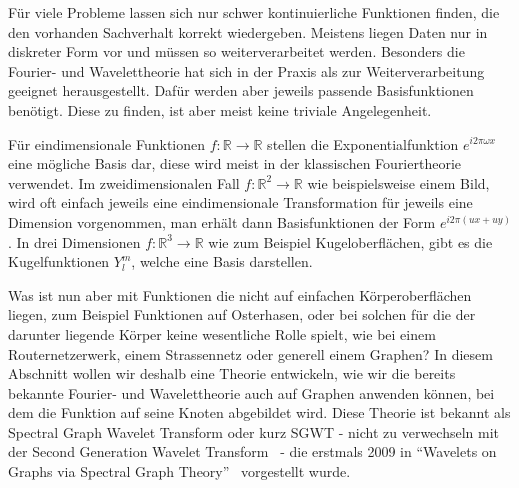 

F\"ur viele Probleme lassen sich nur schwer kontinuierliche Funktionen finden, 
die den vorhanden Sachverhalt korrekt wiedergeben. Meistens liegen Daten 
nur in diskreter Form vor und m\"ussen so weiterverarbeitet werden. Besonders 
die Fourier- und Wavelettheorie hat sich in der Praxis als zur 
Weiterverarbeitung geeignet herausgestellt. Daf\"ur werden aber jeweils 
passende Basisfunktionen ben\"otigt. Diese zu finden, ist aber meist keine 
triviale Angelegenheit.

F\"ur eindimensionale Funktionen $f: \mathbb{R} \rightarrow \mathbb{R}$ stellen 
die Exponentialfunktion $e^{i2\pi\omega x}$ eine m\"ogliche Basis dar, diese 
wird meist in der klassischen Fouriertheorie verwendet. Im 
zweidimensionalen Fall $f: \mathbb{R}^2 \rightarrow \mathbb{R}$ wie 
beispielsweise einem Bild, wird oft einfach jeweils eine eindimensionale 
Transformation f\"ur jeweils eine Dimension vorgenommen, man erh\"alt dann 
Basisfunktionen der Form $e^{i2\pi(ux+uy)}$. In drei Dimensionen $f: 
\mathbb{R}^3 \rightarrow \mathbb{R}$ wie zum Beispiel Kugeloberfl\"achen, gibt 
es die Kugelfunktionen $Y^m_l$, welche eine Basis darstellen.

Was ist nun aber mit Funktionen die nicht auf einfachen K\"orperoberfl\"achen 
liegen, zum Beispiel Funktionen auf Osterhasen, oder bei solchen f\"ur die der 
darunter liegende K\"orper keine wesentliche Rolle spielt, wie bei einem 
Routernetzerwerk, einem Strassennetz oder generell einem Graphen? In diesem 
Abschnitt wollen wir deshalb eine Theorie entwickeln, wie wir die bereits 
bekannte Fourier- und Wavelettheorie auch auf Graphen anwenden k\"onnen, bei 
dem die Funktion auf seine Knoten abgebildet wird. Diese Theorie ist bekannt 
als Spectral Graph Wavelet Transform oder kurz SGWT - nicht zu verwechseln mit 
der Second Generation Wavelet Transform~\cite{noauthor_second-generation_2018} 
- die erstmals 2009 in ``Wavelets on Graphs via Spectral Graph 
Theory''~\cite{hammond_wavelets_2009} 
vorgestellt wurde.
